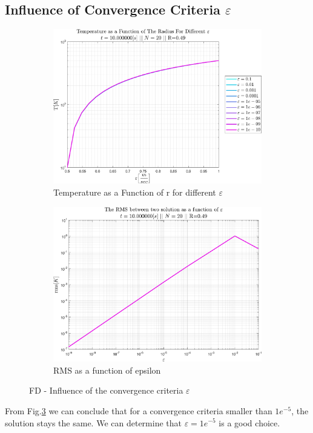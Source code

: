 \documentclass[11pt, a4paper]{article}
\begin{document}
\subsection{Influence of Convergence Criteria $\varepsilon$}
\begin{figure}[H]
    \centering
    \begin{subfigure}[c]{0.49\textwidth}
        \centering
        \includegraphics[width=\textwidth]{images/Influenc of epsilon.png}
        \caption{Temperature as a Function of r for different $\varepsilon$}
        \label{fig: T vs r for diff epsilon}
    \end{subfigure}
    \hfill
    \begin{subfigure}[c]{0.49\textwidth}
        \centering
        \includegraphics[width=\textwidth]{images/Influenc of epsilon - error.png}
        \caption{RMS as a function of epsilon}
        \label{fig: RMS vs epsilon}
    \end{subfigure}
    \caption{FD - Influence of the convergence criteria $\varepsilon$}
    \label{fig: Influence of epsilon}
\end{figure}
From Fig.\ref{fig: Influence of epsilon} we can conclude that for a convergence criteria smaller than $1e^{-5}$, the solution stays the same. We can determine that $\varepsilon=1e^{-5}$ is a good choice.
\end{document}
